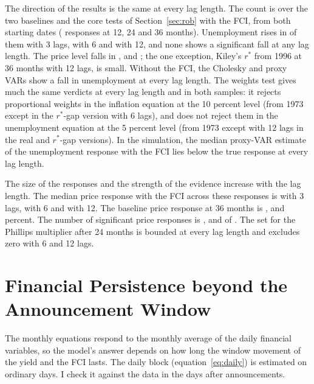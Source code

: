 \documentclass[11pt]{article}
\newcommand{\rs}{r^{*}}
\begin{document}
\begin{appendices}
The direction of the results is the same at every lag length. The count is over the two baselines and the core tests of Section~\ref{sec:rob} with the FCI, from both starting dates ( responses at 12, 24 and 36 months). Unemployment rises in  of them with 3 lags,  with 6 and  with 12, and none shows a significant fall at any lag length. The price level falls in ,  and ; the one exception, Kiley's $\rs$ from 1996 at 36 months with 12 lags, is small. Without the FCI, the Cholesky and proxy VARs show a fall in unemployment at every lag length. The weights test gives much the same verdicts at every lag length and in both samples: it rejects proportional weights in the inflation equation at the 10 percent level (from 1973 except in the $\rs$-gap version with 6 lags), and does not reject them in the unemployment equation at the 5 percent level (from 1973 except with 12 lags in the real and $\rs$-gap versions). In the simulation, the median proxy-VAR estimate of the unemployment response with the FCI lies below the true response at every lag length.

The size of the responses and the strength of the evidence increase with the lag length. The median price response with the FCI across these responses is  with 3 lags,  with 6 and  with 12. The baseline price response at 36 months is ,  and  percent. The number of significant price responses is ,  and  of . The set for the Phillips multiplier after 24 months is bounded at every lag length and excludes zero with 6 and 12 lags.



\FloatBarrier
\section{Financial Persistence beyond the Announcement Window}\label{app:persist}
The monthly equations respond to the monthly average of the daily financial variables, so the model's answer depends on how long the window movement of the yield and the FCI lasts. The daily block (equation~\eqref{eq:daily}) is estimated on ordinary days. I check it against the data in the days after announcements.


\end{appendices}
\end{document}
